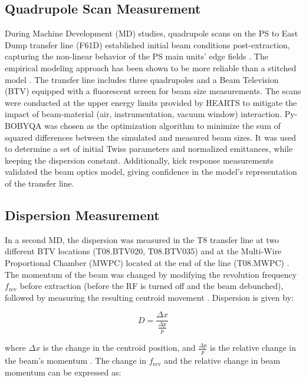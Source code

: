 \documentclass[a4paper,
               biblatex,     %
               ]{jacow}
\begin{document}
\subsection{Quadrupole Scan Measurement}

During Machine Development (MD) studies, quadrupole scans on the PS to East Dump transfer line (F61D) \cite{RadiationProtectionSurvey} established initial beam conditions post-extraction, capturing the non-linear behavior of the PS main units' edge fields \cite{angladaReferenceMagneticModel2019, manglunkiBeamOpticsModeling1997, zicklerInfluenceShimsPS}. The empirical modeling approach has been shown to be more reliable than a stitched model \cite{johnson:ipac22-mopotk030}. The transfer line includes three quadrupoles and a Beam Television (BTV) equipped with a fluorescent screen for beam size measurements. The scans were conducted at the upper energy limits provided by HEARTS to mitigate the impact of beam-material (air, instrumentation, vacuum window) interaction. Py-BOBYQA \cite{cartis_escaping_2022, cartis_improving_2019} was chosen as the optimization algorithm to minimize the sum of squared differences between the simulated and measured beam sizes. It was used to determine a set of initial Twiss parameters and normalized emittances, while keeping the dispersion constant. Additionally, kick response measurements validated the beam optics model, giving confidence in the model's representation of the transfer line.



\subsection{Dispersion Measurement}

In a second MD, the dispersion was measured in the T8 transfer line at two different BTV locations (T08.BTV020, T08.BTV035) and at the Multi-Wire Proportional Chamber (MWPC) located at the end of the line (T08.MWPC) \cite{carlsenChapterBeamlineMain2021}. The momentum of the beam was changed by modifying the revolution frequency $f_{\text{rev}}$ before extraction (before the RF is turned off and the beam debunched), followed by measuring the resulting centroid movement \cite{mintyBeamTechniquesBeam2003}. Dispersion is given by:

\begin{equation}
D = \frac{\Delta x}{\frac{\Delta p}{p}}
\end{equation}

\noindent where $\Delta x$ is the change in the centroid position, and $\frac{\Delta p}{p}$ is the relative change in the beam's momentum \cite{chaoHandbookAcceleratorPhysics2023}. The change in $f_{\text{rev}}$ and the relative change in beam momentum can be expressed as:
\end{document}
